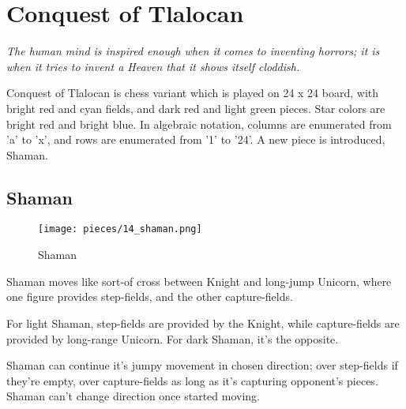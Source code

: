 

\chapter*{Conquest of Tlalocan}

\begin{flushright}
\parbox{0.8\textwidth}{
\emph{The human mind is inspired enough when it comes to inventing
horrors; it is when it tries to invent a Heaven that it shows itself
cloddish. \\
 } }
\end{flushright}

\noindent
Conquest of Tlalocan is chess variant which is played on 24 x 24 board,
with bright red and cyan fields, and dark red and light green pieces.
Star colors are bright red and bright blue. In algebraic notation, columns
are enumerated from 'a' to 'x', and rows are enumerated from '1' to '24'.
A new piece is introduced, Shaman.

\clearpage %

\section*{Shaman}

\noindent
\begin{wrapfigure}[11]{l}{0.4\textwidth}
\centering
\texttt{[image: pieces/14\_shaman.png]}
\caption{Shaman}
\label{fig:14_shaman}
\end{wrapfigure}
Shaman moves like sort-of cross between Knight and long-jump Unicorn,
where one figure provides step-fields, and the other capture-fields.

For light Shaman, step-fields are provided by the Knight, while capture-fields
are provided by long-range Unicorn. For dark Shaman, it's the opposite.

Shaman can continue it's jumpy movement in chosen direction; over step-fields
if they're empty, over capture-fields as long as it's capturing opponent's
pieces. Shaman can't change direction once started moving.

